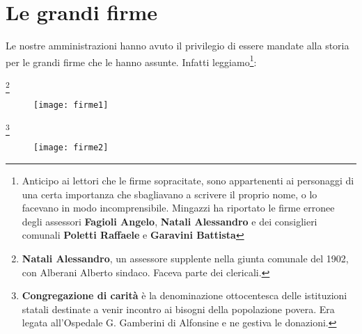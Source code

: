 
\chapter{Le grandi firme}
Le nostre amministrazioni hanno avuto il privilegio di essere mandate alla storia per le grandi firme che le hanno assunte.
Infatti leggiamo\footnote{Anticipo ai lettori che le firme sopracitate, sono appartenenti ai personaggi di una certa importanza che sbagliavano a scrivere il proprio nome, o lo facevano in modo incomprensibile. Mingazzi ha riportato le firme erronee degli assessori \textbf{Fagioli Angelo}, \textbf{Natali Alessandro} e dei consiglieri comunali \textbf{Poletti Raffaele} e \textbf{Garavini Battista}}:

\begin{center}
	\Huge
	\normalsize
	\footnote{\textbf{Natali Alessandro}, un assessore supplente nella giunta comunale del 1902, con Alberani Alberto sindaco. Faceva parte dei clericali.}
\end{center}
	
 \begin{figure}[htb]
    \vspace{-0.75cm}
    \texttt{[image: firme1]}
    \caption*{\label{fig:firme1}}
    \vspace{-1cm}
\end{figure}

\begin{center}
	\Huge
	\normalfont
	\normalsize
	\footnote{\textbf{Congregazione di carità} è la denominazione ottocentesca delle istituzioni statali destinate a venir incontro ai bisogni della popolazione povera. Era legata all'Ospedale G. Gamberini di Alfonsine e ne gestiva le donazioni.}
\end{center}

\begin{figure}[htb]
    \centering
    \vspace{-0.65cm}
    \texttt{[image: firme2]}
    \caption*{\label{fig:firme2}}
    \vspace{-0.3cm}
\end{figure}

